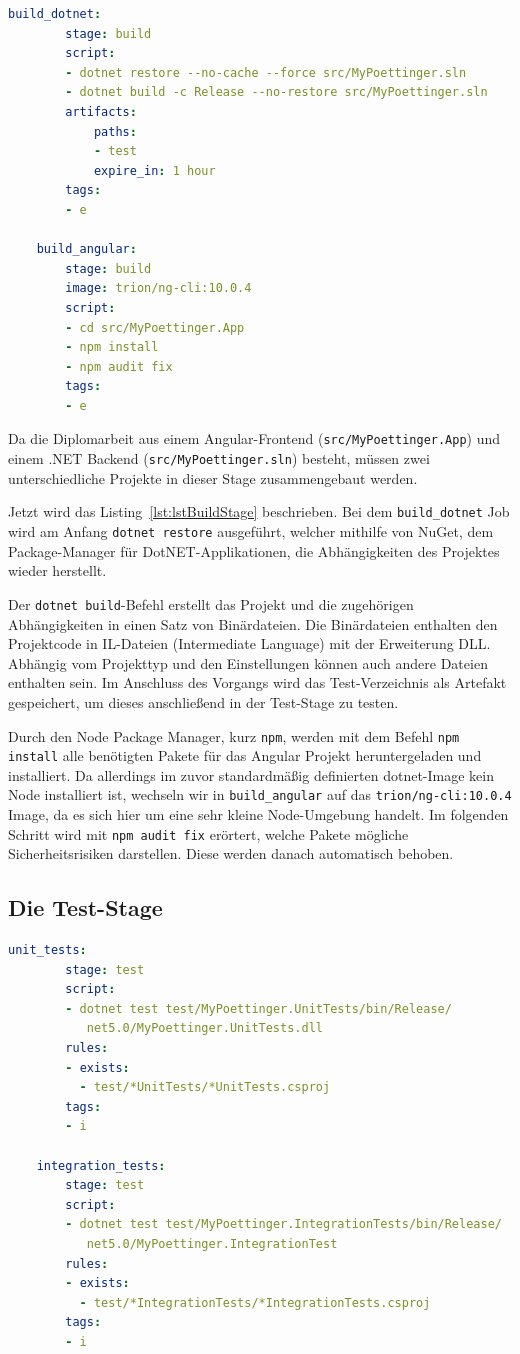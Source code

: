 \begin{lstlisting}[caption={Die Build-Stage der gitlab-ci.yml Datei}, language=yaml, label={lst:lstBuildStage}]
	build_dotnet:
		stage: build
		script:
		- dotnet restore --no-cache --force src/MyPoettinger.sln
		- dotnet build -c Release --no-restore src/MyPoettinger.sln
  		artifacts:
			paths:
			- test
			expire_in: 1 hour
		tags:
		- e
	
	build_angular:
		stage: build
		image: trion/ng-cli:10.0.4
		script: 
		- cd src/MyPoettinger.App
		- npm install
		- npm audit fix
		tags:
		- e
\end{lstlisting}

Da die Diplomarbeit aus einem Angular-Frontend (\texttt{src/MyPoettinger.App}) und einem .NET Backend (\texttt{src/MyPoettinger.sln}) besteht, müssen zwei unterschiedliche Projekte in dieser Stage zusammengebaut werden. 

Jetzt wird das Listing~\ref{lst:lstBuildStage} beschrieben. Bei dem \texttt{build\_dotnet} Job wird am Anfang \texttt{dotnet restore} ausgeführt, welcher mithilfe von NuGet, dem Package-Manager für DotNET-Applikationen, die Abhängigkeiten des Projektes wieder herstellt. 

Der \texttt{dotnet build}-Befehl erstellt das Projekt und die zugehörigen Abhängigkeiten in einen Satz von Binärdateien. Die Binärdateien enthalten den Projektcode in IL-Dateien (Intermediate Language) mit der Erweiterung DLL. Abhängig vom Projekttyp und den Einstellungen können auch andere Dateien enthalten sein.\cite{dotnetBuildDesc} Im Anschluss des Vorgangs wird das Test-Verzeichnis als Artefakt gespeichert, um dieses anschließend in der Test-Stage zu testen.

Durch den Node Package Manager, kurz \texttt{npm}, werden mit dem Befehl \texttt{npm install} alle benötigten Pakete für das Angular Projekt heruntergeladen und installiert. Da allerdings im zuvor standardmäßig definierten dotnet-Image kein Node installiert ist, wechseln wir in \texttt{build\_angular} auf das \texttt{trion/ng-cli:10.0.4} Image, da es sich hier um eine sehr kleine Node-Umgebung handelt. Im folgenden Schritt wird mit \texttt{npm audit fix} erörtert, welche Pakete mögliche Sicherheitsrisiken darstellen. Diese werden danach automatisch behoben. 

\subsection{Die Test-Stage}

\begin{lstlisting}[caption={Die Test-Stage der gitlab-ci.yml Datei}, language=yaml, label={lst:lstTestStage}]
	unit_tests:
		stage: test
		script: 
		- dotnet test test/MyPoettinger.UnitTests/bin/Release/
		   net5.0/MyPoettinger.UnitTests.dll
		rules:
		- exists:
		  - test/*UnitTests/*UnitTests.csproj
		tags:
		- i  
	
	integration_tests:
		stage: test
		script: 
		- dotnet test test/MyPoettinger.IntegrationTests/bin/Release/
		   net5.0/MyPoettinger.IntegrationTest
		rules:
		- exists:
		  - test/*IntegrationTests/*IntegrationTests.csproj
		tags:
		- i
\end{lstlisting}

